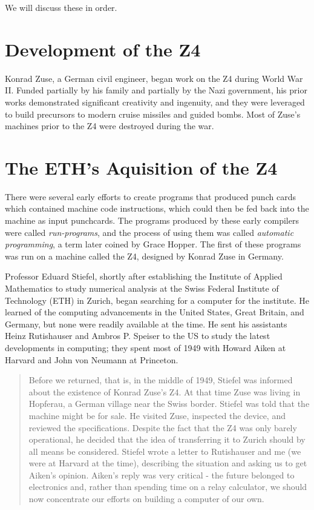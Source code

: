 We will discuss these in order.

\section{Development of the Z4}

Konrad Zuse, a German civil engineer, began work on the Z4 during World War II.
Funded partially by his family and partially by the Nazi government, his prior works
demonstrated significant creativity and ingenuity, and they were leveraged to build
precursors to modern cruise missiles and guided bombs.
Most of Zuse's machines prior to the Z4 were destroyed during the war.


\section{The ETH's Aquisition of the Z4}

There were several early efforts to create programs that produced punch cards
which contained machine code instructions, which could then be fed back into the machine
as input punchcards.
The programs produced by these early compilers were called \textit{run-programs},
and the process of using them was called \textit{automatic programming}, a term later
coined by Grace Hopper.
The first of these programs was run on a machine called the Z4, designed by Konrad Zuse in Germany.

Professor Eduard Stiefel, shortly after establishing the Institute of Applied Mathematics
to study numerical analysis at the Swiss Federal Institute of Technology (ETH) in Zurich,
began searching for a computer for the institute.
He learned of the computing advancements in the United States, Great Britain, and Germany,
but none were readily available at the time.
He sent his assistants Heinz Rutishauser and Ambros P. Speiser to the US to study
the latest developments in computing; they spent most of 1949 with
Howard Aiken at Harvard and John von Neumann at Princeton.

\begin{quotation}
    Before we returned, that is, in the middle of 1949, Stiefel was informed about the existence of Konrad Zuse's
Z4. At that time Zuse was living in Hopferau, a German village near the Swiss border. Stiefel was told that
the machine might be for sale. He visited Zuse, inspected the device, and reviewed the specifications.
Despite the fact that the Z4 was only barely operational, he decided that the idea of transferring it to Zurich
should by all means be considered. Stiefel wrote a letter to Rutishauser and me (we were at Harvard at the
time), describing the situation and asking us to get Aiken's opinion. Aiken's reply was very critical - the
future belonged to electronics and, rather than spending time on a relay calculator, we should now
concentrate our efforts on building a computer of our own.\cite{konrad_zuses_z4_2000}
\end{quotation}


